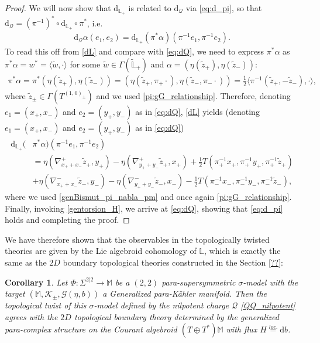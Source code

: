\documentclass{article}
\newcommand{\TT}{{T\oplus T^*}}
\newcommand{\KK}{\mathcal{K}}
\newcommand{\GG}{\mathcal{G}}
\newcommand{\QQ}{\mathcal{Q}}
\newcommand{\ap}{\alpha}
\newcommand{\n}{\nabla}
\newcommand{\rd}{\mathrm{d}}
\newcommand{\Lb}{\mathbb{L}}
\newcommand{\se}{\Gamma}
\newcommand{\la}{\langle}
\newcommand{\ra}{\rangle}
\newcommand{\zt}{\tl{z}}
\newcommand{\Mb}{\mathbb{M}}
\def\tl{\tilde}
\newtheorem{corollary}[theorem]{Corollary}
\theoremstyle{definition}
\theoremstyle{remark}
\begin{document}
\begin{proof}
We will now show that $\rd_{\Lb_+}$ is related to $\rd_\QQ$ via \eqref{eq:d_pi}, so that $\rd_\QQ=(\pi^{-1})^*\circ \rd_{\Lb_+}\circ \pi^*$, i.e.
\begin{align*}
\rd_\QQ\ap(e_1,e_2)=\rd_{\Lb_+}(\pi^*\ap)(\pi^{-1}e_1,\pi^{-1}e_2).
\end{align*}
To read this off from \eqref{dL} and compare with \eqref{eq:dQ}, we need to express $\pi^*\ap$ as $\pi^*\ap=w^*=\la \tl{w},\cdot\ra$ for some $\tl{w}\in\se (\tl{\Lb}_+)$ and $\ap=(\eta(\zt_+),\eta(\zt_-))$:
\begin{align*}
\pi^*\ap=\pi^*(\eta(\zt_+),\eta(\zt_-))=(\eta(\zt_+,\pi_+\cdot),\eta(\zt_-,\pi_-\cdot))=\frac{1}{2}\la\pi^{-1}(\zt_+,-\zt_-),\cdot\ra,
\end{align*}
where $\zt_\pm\in \se(T^{(1,0)_\pm})$ and we used \eqref{pi:gG_relationship}. Therefore, denoting $e_1=(x_+,x_-)$ and $e_2=(y_+,y_-)$ as in \eqref{eq:dQ}, \eqref{dL} yields (denoting $e_1=(x_+,x_-)$ and $e_2=(y_+,y_-)$ as in \eqref{eq:dQ})
\begin{align*}
\rd_{\Lb_+}(&\pi^*\ap)(\pi^{-1}e_1,\pi^{-1}e_2)\\
&=\eta(\n^+_{x_++x_-}\zt_+,y_+)-\eta(\n^+_{y_++y_-}\zt_+,x_+)+\frac{1}{2}T(\pi_+^{-1}x_+,\pi_+^{-1}y_+,\pi_+^{-1}\zt_+)\\
&+\eta(\n^-_{x_++x_-}\zt_-,y_-)-\eta(\n^-_{y_++y_-}\zt_-,x_-)-\frac{1}{2}T(\pi_-^{-1}x_-,\pi_-^{-1}y_-,\pi_-^{-1}\zt_-),
\end{align*}
where we used \eqref{genBismut_pi_nabla_pm} and once again \eqref{pi:gG_relationship}. Finally, invoking \eqref{gentorsion_H}, we arrive at \eqref{eq:dQ}, showing that \eqref{eq:d_pi} holds and completing the proof.
\end{proof}

We have therefore shown that the observables in the topologically twisted theories are given by the Lie algebroid cohomology of $\Lb$, which is exactly the same as the $2D$ boundary topological theories constructed in the Section \ref{??}:
\begin{corollary}
Let $\Phi:\Sigma^{2|2}\rightarrow \Mb$ be a $(2,2)$ para-supersymmetric $\sigma$-model with the target $(\Mb,\KK_\pm,\GG(\eta,b))$ a Generalized para-K\"ahler manifold. Then the topological twist of this $\sigma$-model defined by the nilpotent charge $\QQ$ \eqref{QQ_nilpotent} agrees with the $2D$ topological boundary theory determined by the generalized para-complex structure on the Courant algebroid $(\TT)\Mb$ with flux $H\overset{loc.}{=}\rd b$.
\end{corollary}
\end{document}
